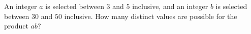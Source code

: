 An integer $a$ is selected between $3$ and $5$ inclusive, and an integer $b$ is selected between $30$ and $50$ inclusive. How many distinct values are possible for the product $ab$?
